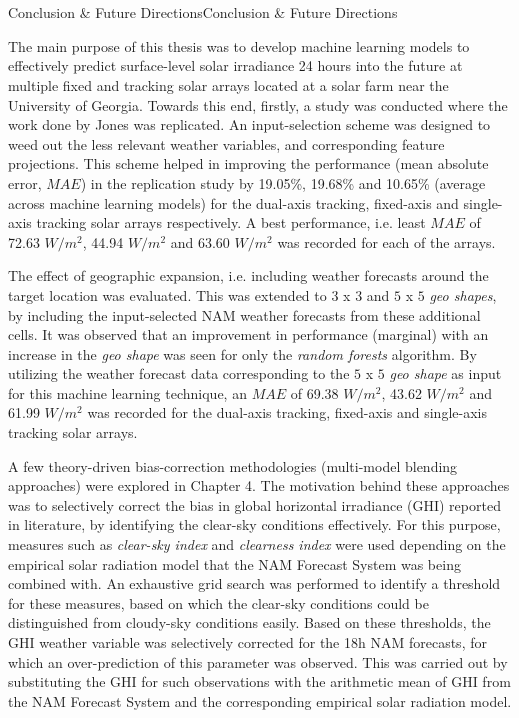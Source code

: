 \chapter{}{Conclusion \& Future Directions}{Conclusion \& Future Directions}

\par The main purpose of this thesis was to develop machine learning models to effectively predict surface-level solar irradiance 24 hours into the future at multiple fixed and tracking solar arrays located at a solar farm near the University of Georgia. Towards this end, firstly, a study was conducted where the work done by Jones \cite{thesis_zach} was replicated. An input-selection scheme was designed to weed out the less relevant weather variables, and corresponding feature projections. This scheme helped in improving the performance (mean absolute error, $MAE$) in the replication study by 19.05\%, 19.68\% and 10.65\% (average across machine learning models) for the dual-axis tracking, fixed-axis and single-axis tracking solar arrays respectively. A best performance, i.e. least $MAE$ of 72.63 $W/m^2$, 44.94 $W/m^2$ and 63.60 $W/m^2$ was recorded for each of the arrays.

\par The effect of geographic expansion, i.e. including weather forecasts around the target location was evaluated. This was extended to $3$ x $3$ and $5$ x $5$ \textit{geo shapes}, by including the input-selected NAM weather forecasts from these additional cells. It was observed that an improvement in performance (marginal) with an increase in the \textit{geo shape} was seen for only the \textit{random forests} algorithm. By utilizing the weather forecast data corresponding to the $5$ x $5$ \textit{geo shape} as input for this machine learning technique, an $MAE$ of 69.38 $W/m^2$, 43.62 $W/m^2$ and 61.99 $W/m^2$ was recorded for the dual-axis tracking, fixed-axis and single-axis tracking solar arrays.

\par A few theory-driven bias-correction methodologies (multi-model blending approaches) were explored in Chapter 4. The motivation behind these approaches was to selectively correct the bias in global horizontal irradiance (GHI) reported in literature, by identifying the clear-sky conditions effectively. For this purpose, measures such as \textit{clear-sky index} and \textit{clearness index} were used depending on the empirical solar radiation model that the NAM Forecast System was being combined with. An exhaustive grid search was performed to identify a threshold for these measures, based on which the clear-sky conditions could be distinguished from cloudy-sky conditions easily. Based on these thresholds, the GHI weather variable was selectively corrected for the 18h NAM forecasts, for which an over-prediction of this parameter was observed. This was carried out by substituting the \restoregeometry\noindent GHI for such observations with the arithmetic mean of GHI from the NAM Forecast System and the corresponding empirical solar radiation model.

